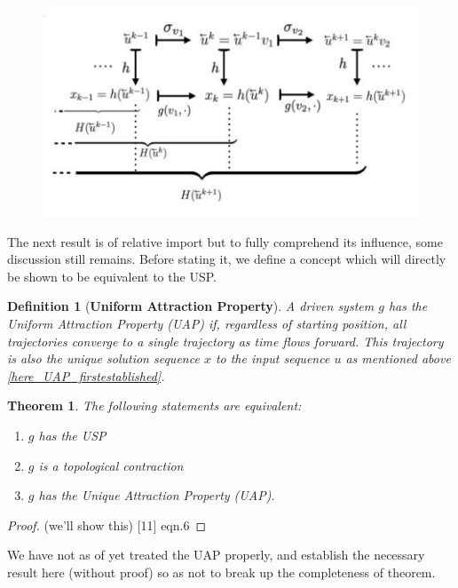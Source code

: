 \documentclass[12 pt]{article}
\newtheorem{Definition}{Definition}[]
\newtheorem{Theorem}{Theorem}[]
\begin{document}
\begin{figure}[ht]
  \includegraphics[scale=0.3]{actionofh_H.png}
  \centering
  \label{fig:actionh_H}
\end{figure}

The next result is of relative import but to fully comprehend its influence, some discussion still remains. Before stating it, we define a concept which will directly be shown to be equivalent to the USP.

\begin{Definition}
  [\bf Uniform Attraction Property]\label{Dfn_UAP}
  A driven system $g$ has the Uniform Attraction Property (UAP) if, regardless of starting position, all trajectories converge to a single trajectory as time flows forward. 
  This trajectory is also the unique solution sequence $x$ to the input sequence $u$ as mentioned above \ref{here_UAP_firstestablished}.
\end{Definition}

\begin{Theorem}
  The following statements are equivalent:
  \vspace{-8mm}
  \begin{enumerate}[noitemsep, label=\roman*.]
    \item $g$ has the USP 
    \item $g$ is a topological contraction 
    \item $g$ has the Unique Attraction Property (UAP). 
  \end{enumerate}
\end{Theorem}
\begin{proof}
  (we’ll show this)  [11] eqn.6 
\end{proof}

We have not as of yet treated the UAP properly, and establish the necessary result here (without proof) so as not to break up the completeness of theorem. 
\end{document}
